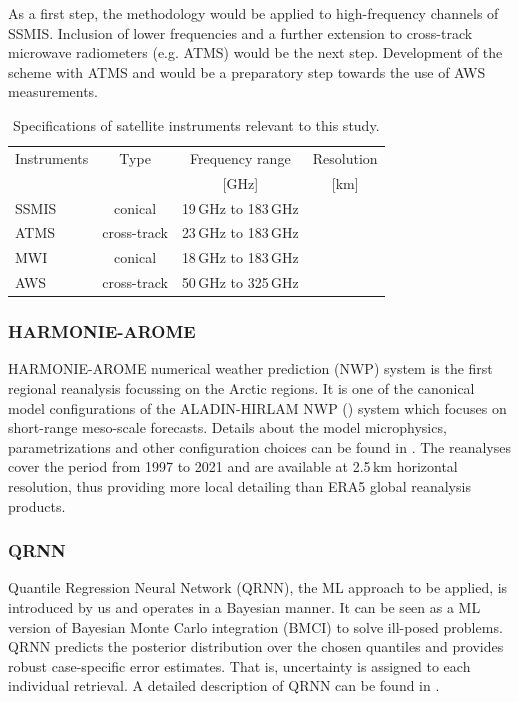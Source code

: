 \documentclass[12pt,oneside,a4paper]{article}
\begin{document}
As a first step, the methodology would be applied to high-frequency channels of SSMIS. Inclusion of lower frequencies and a further extension to cross-track microwave radiometers (e.g. ATMS) would be the next step. Development of the scheme with ATMS and would be a preparatory step towards the use of AWS measurements. 

\begin{table}[t]
	\centering
	\caption{Specifications of satellite instruments relevant to this study.}
	\label{tab:specifications_instruments}	
	\begin{tabular}{lccc}

		Instruments &Type& Frequency range 	& Resolution  \\
					&     & 	[GHz]				& [km]			\\
		\hline			
		SSMIS		&conical	&19\,GHz to 183\,GHz& \\
		ATMS        &cross-track&23\,GHz to 183\,GHz &\\
		\hline
		MWI         &conical     &18\,GHz to 183\,GHz&\\
		AWS         &cross-track &50\,GHz to 325\,GHz&\\ 
		
		\hline			

	\end{tabular}
\end{table}

\subsubsection{HARMONIE-AROME}
%
\label{sec:harmonie}
HARMONIE-AROME numerical weather prediction (NWP) system is the first regional reanalysis focussing on the Arctic regions. It is one of the canonical model configurations of the ALADIN-HIRLAM NWP () system which focuses on short-range meso-scale forecasts. Details about the model microphysics, parametrizations and other configuration choices can be found in \citep{bengtsson:2017:harmo}. The reanalyses cover the period from 1997 to 2021 and are available at 2.5\,km horizontal resolution, thus providing more local detailing than ERA5 global reanalysis products.  
 
\subsubsection{QRNN}
%
\label{sec:qrnn}

Quantile Regression Neural Network (QRNN), the ML approach to be applied, is introduced by us and operates in a Bayesian manner. It can be seen as a ML version of Bayesian Monte Carlo integration (BMCI) to solve ill-posed problems. QRNN predicts the posterior distribution over the chosen quantiles and provides robust case-specific error estimates. That is, uncertainty is assigned to each individual retrieval. A detailed description of QRNN can be found in \citet{pfreundschuh:aneur:18}. 
\end{document}
